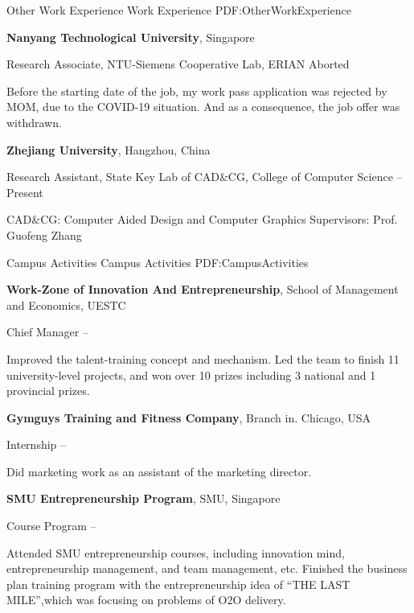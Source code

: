\documentclass[letterpaper,MMMyyyy,nonstopmode]{simpleresumecv}
\begin{document}
\begin{Body}
\Section
{Other Work\newline
	Experience}
{Work Experience}
{PDF:OtherWorkExperience}


{\textbf{Nanyang Technological University}},
Singapore

\BulletItem
Research Associate,
NTU-Siemens Cooperative Lab, ERIAN
\hfill
Aborted
\begin{Detail}
	\SubBulletItem
	Before the starting date of the job, my work pass application was rejected by MOM, due to the COVID-19 situation. And as a consequence, the job offer was withdrawn.
\end{Detail}

\Gap
\Entry
{\textbf{Zhejiang University}},
Hangzhou, China

\BulletItem
Research Assistant,
State Key Lab of CAD\&CG,
College of Computer Science
\hfill
{} --
Present
\begin{Detail}
	\SubBulletItem
	CAD\&CG: Computer Aided Design and Computer Graphics
	\SubBulletItem
	Supervisors:
	Prof. Guofeng Zhang
\end{Detail}

\Section
{Campus Activities}
{Campus Activities}
{PDF:CampusActivities}

\Entry
{\textbf{Work-Zone of Innovation And Entrepreneurship}},
School of Management and Economics, 
UESTC

\BulletItem
Chief Manager
\hfill
{} --
\begin{Detail}
\SubBulletItem
Improved the talent-training concept and mechanism.
\SubBulletItem
Led the team to finish 11 university-level projects, and won over 10 prizes including 3 national
 and 1 provincial prizes.
\end{Detail}

\Gap
{\textbf{Gymguys Training and Fitness Company}},
Branch in. 
Chicago, 
USA

\BulletItem
Internship
\hfill
{} --
\begin{Detail}
	\SubBulletItem
	Did marketing work as an assistant of the marketing director.
\end{Detail}

\Gap
{\textbf{SMU Entrepreneurship Program}},
SMU,
Singapore

\BulletItem
Course Program
\hfill
{} --
\begin{Detail}
\SubBulletItem
Attended SMU entrepreneurship courses, including innovation mind, entrepreneurship management, and team management, etc.
\SubBulletItem
Finished the business plan training program with the entrepreneurship idea of “THE LAST MILE”,which was focusing on problems of O2O delivery.
\end{Detail}




\end{Body}
\end{document}
